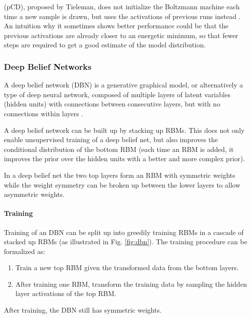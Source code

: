 (pCD), proposed by Tieleman, does not initialize the Boltzmann machine each time a new sample is drawn, but uses the activations of previous runs instead \cite{tieleman2008training}. 
An intuition why it sometimes shows better performance could be that the previous activations are already closer to an energetic minimum, so that fewer steps are required to get a good estimate of the model distribution. 


\subsubsection{Deep Belief Networks} \label{c:dbns}

A deep belief network (DBN) is a generative graphical model, or alternatively a type of deep neural network, composed of multiple layers of latent variables (hidden units) with connections between consecutive layers, but with no connections within layers \cite{Goodfellow-et-al-2016-Book, hinton2009deep, hinton2006fast}.

A deep belief network can be built up by stacking up RBMs.
This does not only enable unsupervised training of a deep belief net, but also improves the conditional distribution of the bottom RBM (each time an RBM is added, it improves the prior over the hidden units with a better and more complex prior).

In a deep belief net the two top layers form an RBM with symmetric weights while the weight symmetry can be broken up between the lower layers to allow asymmetric weights.   

\paragraph{Training} \label{c:dbntraining}

Training of an DBN can be split up into greedily training RBMs in a cascade of stacked up RBMs (as illustrated in Fig. \ref{fig:dbn}).
The training procedure can be formalized as:  
\begin{enumerate}
\item Train a new top RBM given the transformed data from the bottom layers.
\item After training one RBM, transform the training data by sampling the hidden layer activations of the top RBM.
\end{enumerate}

After training, the DBN still has symmetric weights. 

